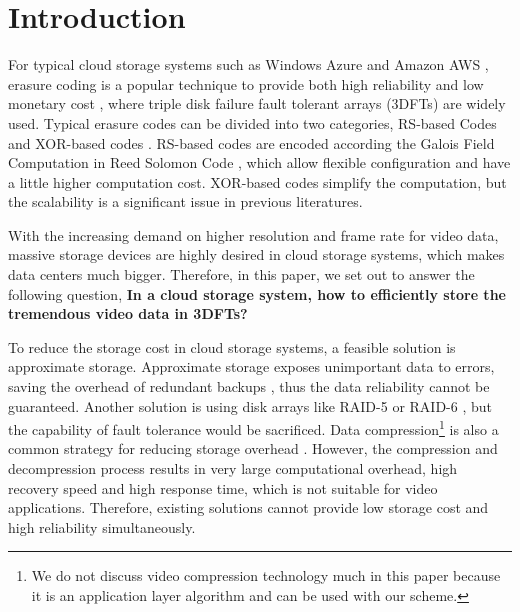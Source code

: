 \documentclass[sigconf]{acmart}
\begin{document}
%
%

\maketitle

\section{Introduction}
For typical cloud storage systems such as Windows Azure \cite{calder2011windows} and Amazon AWS \cite{bermudez2013exploring}, erasure coding is a popular technique to provide both high reliability and low monetary cost \cite{EVENODD, RDP, BlaumRoth, XCode, CRS, TripleStar, TPtech, RSL}, where triple disk failure fault tolerant arrays (3DFTs) are widely used. Typical erasure codes can be divided into two categories, RS-based Codes \cite{RS} \cite{LRC} and XOR-based codes \cite{EVENODD, HCODE, STAR, tip}. RS-based codes are encoded according the Galois Field Computation in Reed Solomon Code \cite{RS}, which allow flexible configuration and have a little higher computation cost. XOR-based codes simplify the computation, but the scalability is a significant issue in previous literatures.

With the increasing demand on higher resolution and frame rate for video data, massive storage devices are highly desired in cloud storage systems, which makes data centers much bigger.
Therefore, in this paper, we set out to answer the following question,
\textbf{In a cloud storage system, how to efficiently store the tremendous video data in 3DFTs?}


To reduce the storage cost in cloud storage systems, a feasible solution is approximate storage. Approximate storage exposes unimportant data to errors, saving the overhead of redundant backups \cite{niklaus2018context, sampson2014approximate} , thus the data reliability cannot be guaranteed.
Another solution is using disk arrays like RAID-5 or RAID-6 \cite{RAID}, but the capability of fault tolerance would be sacrificed.
Data compression\footnote{We do not discuss video compression technology much in this paper because it is an application layer algorithm and can be used with our scheme.} is also a common strategy for reducing storage overhead \cite{ziv1977universal, ziv1978compression, deutsch1996deflate}. However, the compression and decompression process results in very large computational overhead, high recovery speed and high response time, which is not suitable for video applications.
Therefore, existing solutions cannot provide low storage cost and high reliability simultaneously.
\end{document}
